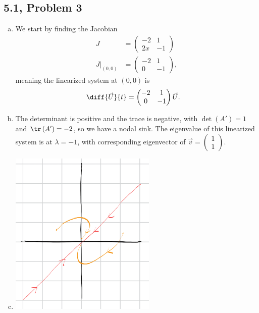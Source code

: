 \documentclass[10pt]{mypackage}
\begin{document}
\subsection{5.1, Problem 3}%
\begin{enumerate}[(a)]
  \item We start by finding the Jacobian
    \begin{align*}
      J &= \begin{pmatrix}-2 & 1 \\2x & -1 \end{pmatrix}\\
      J|_{(0,0)} &= \begin{pmatrix}-2 & 1 \\ 0 & -1\end{pmatrix},
    \end{align*}
    meaning the linearized system at $\left(0,0\right)$ is
    \begin{align*}
      \diff{\vec{U}}{t} &= \begin{pmatrix}-2 & 1 \\ 0 & -1\end{pmatrix} \vec{U}.
    \end{align*}
  \item The determinant is positive and the trace is negative, with $\det\left(A'\right) = 1$ and $\tr\left(A'\right) = -2$, so we have a nodal sink. The eigenvalue of this linearized system is at $\lambda = -1$, with corresponding eigenvector of $\vec{v} = \begin{pmatrix}1\\1\end{pmatrix}$.
  \item 
    \begin{center}
      \includegraphics[width=7cm]{images/5_1_3c1.png}
    \end{center}

\end{enumerate}
\end{document}

